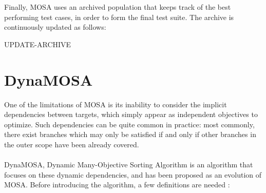 \newpage
Finally, MOSA uses an archived population that keeps track of the best performing test cases, in order to form the final test suite. The archive is continuously updated as follows:

\begin{algorithm}[H]
    \caption{UPDATE-ARCHIVE}


    \DontPrintSemicolon   

\end{algorithm}





\newpage
\section{DynaMOSA}
One of the limitations of MOSA is its inability to consider the implicit dependencies between targets, which simply appear as independent objectives to optimize. Such dependencies can be quite common in practice: most commonly, there exist branches which may only be satisfied if and only if other branches in the outer scope have been already covered. 
\\\\
DynaMOSA, Dynamic Many-Objective Sorting Algorithm \cite{DBLP:journals/tse/PanichellaKT18} is an algorithm that focuses on these dynamic dependencies, and has been proposed as an evolution of MOSA. 
Before introducing the algorithm, a few definitions are needed \cite{DBLP:journals/tse/PanichellaKT18}:

